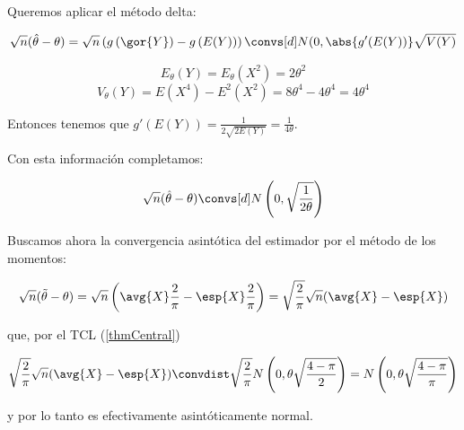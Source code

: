 \begin{problem}[5]
\spart

Queremos aplicar el método delta:

\[\sqrt{n}(\hat{\theta} - \theta) = \sqrt{n}\left(g\left(\gor{Y}\right) - g\left(E(Y)\right)\right) \convs[d]N(0,\abs{g'(E(Y))}\sqrt{V(Y)}\]

\[E_{\theta}(Y) = E_{\theta} (X^2) = 2\theta^2\]
\[V_{\theta}(Y) = E(X^4) - E^2(X^2) = 8\theta^4-4\theta^4 = 4\theta^4\]

Entonces tenemos que $g'(E(Y)) = \displaystyle \frac{1}{2\sqrt{2E(Y)}} = \frac{1}{4\theta}$.

Con esta información completamos:  

\[\sqrt{n}(\hat{\theta} - \theta) \convs[d] N\left(0,\sqrt{\frac{1}{2\theta}}\right)\]

Buscamos ahora la convergencia asintótica del estimador por el método de los momentos:

\[ \sqrt{n}(\tilde\theta-\theta) = \sqrt{n}\left(\avg{X}\frac{2}{\pi}  - \esp{X}\frac{2}{\pi}\right) = \sqrt{\frac{2}{\pi}}\sqrt{n}(\avg{X}-\esp{X}) \]

que, por el TCL (\ref{thmCentral})

\[ \sqrt{\frac{2}{\pi}}\sqrt{n}(\avg{X}-\esp{X})  \convdist  \sqrt{\frac{2}{\pi}}N\left(0,\theta\sqrt{\frac{4-\pi}{2}}\right) = N\left(0,\theta\sqrt{\frac{4-\pi}{\pi}}\right) \]

y por lo tanto es efectivamente asintóticamente normal.

\end{problem}


